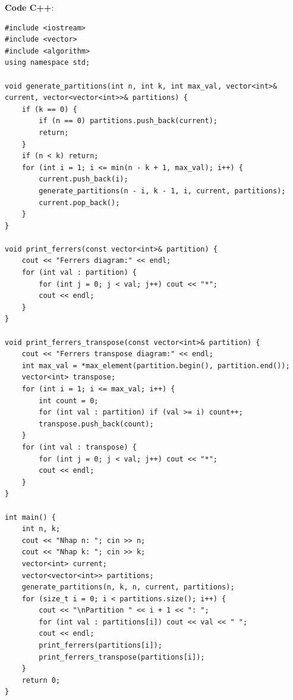 \documentclass[a4paper,12pt]{article}
\begin{document}
\textbf{Code C++}:
\begin{lstlisting}[style=cppstyle]
#include <iostream>
#include <vector>
#include <algorithm>
using namespace std;

void generate_partitions(int n, int k, int max_val, vector<int>& current, vector<vector<int>>& partitions) {
    if (k == 0) {
        if (n == 0) partitions.push_back(current);
        return;
    }
    if (n < k) return;
    for (int i = 1; i <= min(n - k + 1, max_val); i++) {
        current.push_back(i);
        generate_partitions(n - i, k - 1, i, current, partitions);
        current.pop_back();
    }
}

void print_ferrers(const vector<int>& partition) {
    cout << "Ferrers diagram:" << endl;
    for (int val : partition) {
        for (int j = 0; j < val; j++) cout << "*";
        cout << endl;
    }
}

void print_ferrers_transpose(const vector<int>& partition) {
    cout << "Ferrers transpose diagram:" << endl;
    int max_val = *max_element(partition.begin(), partition.end());
    vector<int> transpose;
    for (int i = 1; i <= max_val; i++) {
        int count = 0;
        for (int val : partition) if (val >= i) count++;
        transpose.push_back(count);
    }
    for (int val : transpose) {
        for (int j = 0; j < val; j++) cout << "*";
        cout << endl;
    }
}

int main() {
    int n, k;
    cout << "Nhap n: "; cin >> n;
    cout << "Nhap k: "; cin >> k;
    vector<int> current;
    vector<vector<int>> partitions;
    generate_partitions(n, k, n, current, partitions);
    for (size_t i = 0; i < partitions.size(); i++) {
        cout << "\nPartition " << i + 1 << ": ";
        for (int val : partitions[i]) cout << val << " ";
        cout << endl;
        print_ferrers(partitions[i]);
        print_ferrers_transpose(partitions[i]);
    }
    return 0;
}
\end{lstlisting}
\end{document}
